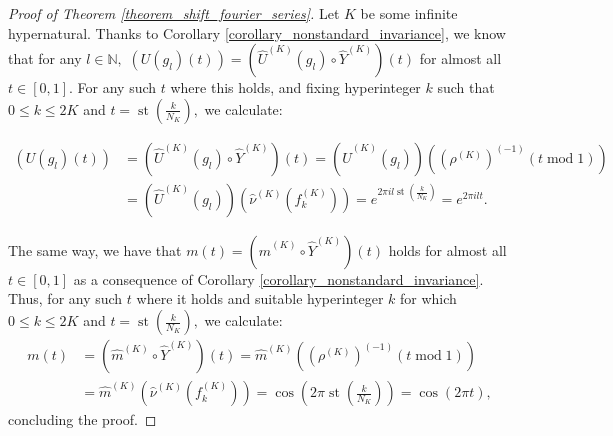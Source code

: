 \documentclass[10pt,a4paper]{amsart}
\def \St{\operatorname{st}}
\def \HNU{\hat{\nu}}
\def \HU{\hat{U}}
\def \Hm{\hat{m}}
\begin{document}
\begin{proof}[Proof of Theorem \ref{theorem_shift_fourier_series}]
	Let $K$ be some infinite hypernatural. Thanks to Corollary \ref{corollary_nonstandard_invariance}, we know that for any $l\in\mathbb{N},$ $(U(g_l)(t))=(\HU^{(K)}(g_l)\circ \hat{Y}^{(K)})(t)$ for almost all $t\in[0,1]$. For any such $t$ where this holds, and fixing hyperinteger $k$ such that $0\leq k\leq 2K$ and $t=\St(\frac{k}{N_K}),$ we calculate:
	
	\begin{align*}
		(U(g_l)(t))&=(\HU^{(K)}(g_l)\circ \hat{Y}^{(K)})(t)=(\HU^{(K)}(g_l))((\rho^{(K)})^{(-1)}(t\operatorname{mod} 1))\\
		&=(\HU^{(K)}(g_l))(\HNU^{(K)}(f_k^{(K)}))=e^{2\pi i l \St(\frac{k}{N_K})}=e^{2\pi i l t}.
	\end{align*}
	
	The same way, we have that $m(t)=(\Hm^{(K)}\circ \hat{Y}^{(K)})(t)$ holds for almost all $t\in[0,1]$ as a consequence of Corollary \ref{corollary_nonstandard_invariance}. Thus, for any such $t$ where it holds and suitable hyperinteger $k$ for which $0\leq k\leq 2K$ and $t=\St(\frac{k}{N_K}),$ we calculate:
	\begin{align*}
		m(t)&=(\Hm^{(K)}\circ \hat{Y}^{(K)})(t)=\Hm^{(K)}((\rho^{(K)})^{(-1)}(t\operatorname{mod} 1))\\
		&=\Hm^{(K)}(\HNU^{(K)}(f_k^{(K)}))=\cos(2\pi\St(\frac{k}{N_K}))=\cos(2\pi t),
	\end{align*}
	concluding the proof.
\end{proof}
	
\end{document}
